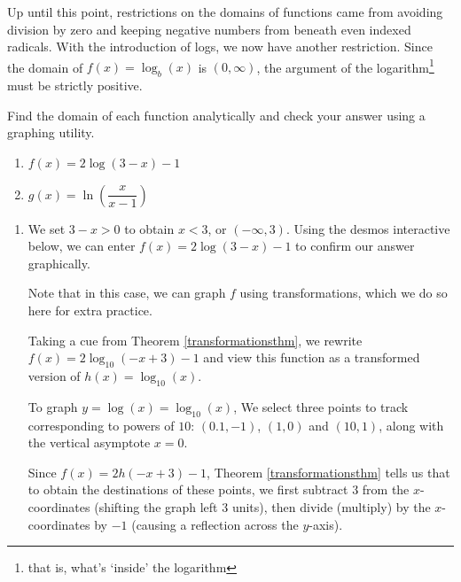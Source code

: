 \documentclass{ximera}
\begin{document}
Up until this point, restrictions on the domains of functions came from avoiding division by zero and keeping negative numbers from beneath even indexed radicals.  With the introduction of logs, we now have another restriction.  Since the domain of $f(x) = \log_{b}(x)$ is $(0, \infty)$, the argument of the logarithm\footnote{ that is, what's `inside' the logarithm}  must be strictly positive.  

\begin{example}  Find the domain of each function analytically and check your answer using a graphing utility.


\begin{enumerate}
\item  $f(x) = 2\log(3-x)-1$ 

\item  $g(x) = \ln \left(\dfrac{x}{x-1}\right)$
\end{enumerate}

\begin{explanation}

\begin{enumerate}

\item  We set $3-x > 0$ to obtain $x<3$, or $(-\infty, 3)$.  Using the desmos interactive below, we can enter $f(x) = 2 \log(3-x)-1$ to confirm our answer graphically.

\begin{center}
\end{center}

Note that in this case, we can graph $f$ using transformations, which we do so here for extra practice. 



Taking a cue from Theorem \ref{transformationsthm}, we rewrite $f(x) = 2 \log_{10}(-x+3) -1$ and  view this function as a transformed version of $h(x) = \log_{10}(x)$. 



To graph $y = \log(x) = \log_{10}(x)$,  We select three points to track corresponding to powers of $10$:  $(0.1, -1)$, $(1,0)$ and $(10,1)$, along with the vertical asymptote $x=0$.  
 

Since $f(x) = 2h(-x+3)-1$, Theorem \ref{transformationsthm} tells us that to obtain the destinations of these points, we first subtract $3$ from the $x$-coordinates (shifting the graph left $3$ units), then divide (multiply) by the $x$-coordinates by $-1$ (causing a reflection across the $y$-axis).   



\end{enumerate}
\end{explanation}
\end{example}
\end{document}
